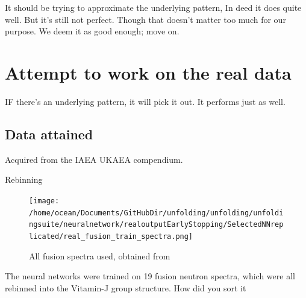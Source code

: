 \documentclass[a4paper, 12pt]{article}
\begin{document}
It should be trying to approximate the underlying pattern,
In deed it does quite well.
But it's still not perfect.
Though that doesn't matter too much for our purpose. We deem it as good enough; move on.

\section{Attempt to work on the real data}

IF there's an underlying pattern, it will pick it out.
It performs just as well.

\subsection{Data attained}
Acquired from the IAEA UKAEA compendium.


Rebinning

\begin{figure}
\centering
\texttt{[image: /home/ocean/Documents/GitHubDir/unfolding/unfolding/unfoldingsuite/neuralnetwork/realoutputEarlyStopping/SelectedNNreplicated/real\_fusion\_train\_spectra.png]}
\caption{All fusion spectra used, obtained from \cite{ukaea_unfolding_support_report_march2017}}\label{RealFusionTrain}
\end{figure}

The neural networks were trained on 19 fusion neutron spectra, which were all rebinned into the Vitamin-J group structure.
How did you sort it
\end{document}
